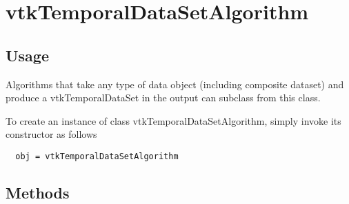 \section{vtkTemporalDataSetAlgorithm}

\subsection{Usage}

 Algorithms that take any type of data object (including composite dataset)
 and produce a vtkTemporalDataSet in the output can subclass from this
 class.

To create an instance of class vtkTemporalDataSetAlgorithm, simply
invoke its constructor as follows
\begin{verbatim}
  obj = vtkTemporalDataSetAlgorithm
\end{verbatim}
\subsection{Methods}

